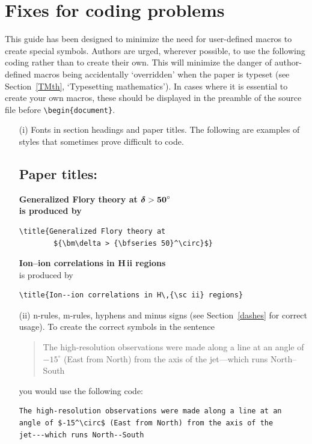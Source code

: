 \documentclass{gAPA2e}
\theoremstyle{plain}
\theoremstyle{remark}
\theoremstyle{definition}
\begin{document}
\section{Fixes for coding problems}

This guide has been designed to minimize the need for user-defined macros to create special symbols. Authors
are urged, wherever possible, to use the following coding rather than to create their own. This will minimize
the danger of author-defined macros being accidentally `overridden' when the paper is typeset (see
Section~\ref{TMth}, `Typesetting mathematics'). In cases where it is essential to create your own macros,
these should be displayed in the preamble of the source file before \verb"\begin{document}".
%
\begin{enumerate}
\item[(i)] Fonts in section headings and paper titles. The following are  examples
of styles that sometimes prove difficult to code.

\subsection*{Paper titles:}

\bf{\noindent Generalized Flory theory at ${\bm\delta >
{\bf 50}^\circ}$}\\

    \noindent\normalfont is produced by
\begin{verbatim}
\title{Generalized Flory theory at
        ${\bm\delta > {\bfseries 50}^\circ}$}
\end{verbatim}
\bigskip

{\bf{\noindent Ion--ion correlations in H\,{\sc ii} regions}}\\

\noindent\normalfont is produced by
%
\begin{verbatim}
\title{Ion--ion correlations in H\,{\sc ii} regions}
\end{verbatim}



\item[(ii)] n-rules, m-rules, hyphens and minus signs (see Section~\ref{dashes} for
correct usage). To create the correct symbols in the sentence
%
\begin{quote}
The high-resolution observations were made along a line at an
angle of $-15^\circ$ (East from North) from the axis of the
jet---which runs North--South
\end{quote}
you would use the following code:
%
\begin{verbatim}
The high-resolution observations were made along a line at an
angle of $-15^\circ$ (East from North) from the axis of the
jet---which runs North--South
\end{verbatim}


\end{enumerate}
\end{document}
